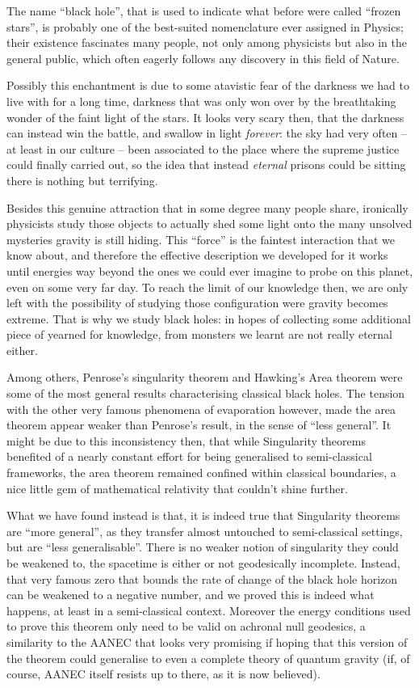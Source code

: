 The name ``black hole'', that is used to indicate what before were called ``frozen stars'', is probably one of the best-suited nomenclature ever assigned in Physics; their existence fascinates many people, not only among physicists but also in the general public, which often eagerly follows any discovery in this field of Nature.

Possibly this enchantment is due to some atavistic fear of the darkness we had to live with for a long time, darkness that was only won over by the breathtaking wonder of the faint light of the stars. It looks very scary then, that the darkness can instead win the battle, and swallow in light \emph{forever}: the sky had very often -- at least in our culture -- been associated to the place where the supreme justice could finally carried out, so the idea that instead \emph{eternal} prisons could be sitting there is nothing but terrifying.  
	
Besides this genuine attraction that in some degree many people share, ironically physicists study those objects to actually shed some light onto the many unsolved mysteries gravity is still hiding.
This ``force'' is the faintest interaction that we know about, and therefore the effective description we developed for it works until energies way beyond the ones we could ever imagine to probe on this planet, even on some very far day. To reach the limit of our knowledge then, we are only left with the possibility of studying those configuration were gravity becomes extreme. That is why we study black holes: in hopes of collecting some additional piece of yearned for knowledge, from monsters we learnt are not really eternal either. 

Among others, Penrose's singularity theorem and Hawking's Area theorem were some of the most general results characterising classical black holes. The tension with the other very famous phenomena of evaporation however, made the area theorem appear weaker than Penrose's result, in the sense of ``less general''. It might be due to this inconsistency then, that while Singularity theorems benefited of a nearly constant effort for being generalised to semi-classical frameworks, the area theorem remained confined within classical boundaries, a nice little gem of mathematical relativity that couldn't shine further.

What we have found instead is that, it is indeed true that Singularity theorems are ``more general'', as they transfer almost untouched to semi-classical settings, but are ``less generalisable''. There is no weaker notion of singularity they could be weakened to, the spacetime is either or not geodesically incomplete. Instead, that very famous zero that bounds the rate of change of the black hole horizon can be weakened to a negative number, and we proved this is indeed what happens, at least in a semi-classical context. 
Moreover the energy conditions used to prove this theorem only need to be valid on achronal null geodesics, a similarity to the AANEC that looks very promising if hoping that this version of the theorem could generalise to even a complete theory of quantum gravity (if, of course, AANEC itself resists up to there, as it is now believed).

